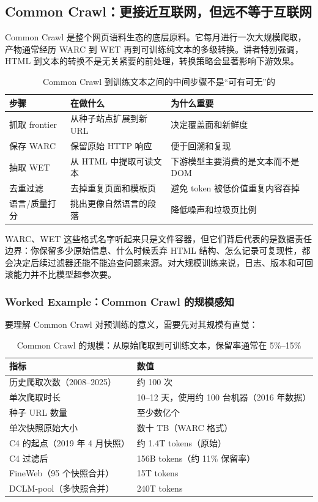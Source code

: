 \subsection{Common Crawl：更接近互联网，但远不等于互联网}

Common Crawl 是整个网页语料生态的底层原料。它每月进行一次大规模爬取，产物通常经历 WARC 到 WET 再到可训练纯文本的多级转换。讲者特别强调，HTML 到文本的转换不是无关紧要的前处理，转换策略会显著影响下游效果。

\begin{table}[H]
\centering
\begin{tabular}{p{}p{}p{}}
\toprule
\textbf{步骤} & \textbf{在做什么} & \textbf{为什么重要} \\
\midrule
抓取 frontier & 从种子站点扩展到新 URL & 决定覆盖面和新鲜度 \\
保存 WARC & 保留原始 HTTP 响应 & 便于回溯和复现 \\
抽取 WET & 从 HTML 中提取可读文本 & 下游模型主要消费的是文本而不是 DOM \\
去重过滤 & 去掉重复页面和模板页 & 避免 token 被低价值重复内容吞掉 \\
语言/质量打分 & 挑出更像自然语言的段落 & 降低噪声和垃圾页比例 \\
\bottomrule
\end{tabular}
\caption{Common Crawl 到训练文本之间的中间步骤不是“可有可无”的}
\end{table}

WARC、WET 这些格式名字听起来只是文件容器，但它们背后代表的是数据责任边界：你保留多少原始信息、什么时候丢弃 HTML 结构、怎么记录可复现性，都会决定后续过滤器还能不能追查问题来源。对大规模训练来说，日志、版本和可回滚能力并不比模型超参次要。

\subsubsection{Worked Example：Common Crawl 的规模感知}

要理解 Common Crawl 对预训练的意义，需要先对其规模有直觉：

\begin{table}[H]
\centering
\begin{tabular}{p{}p{}}
\toprule
\textbf{指标} & \textbf{数值} \\
\midrule
历史爬取次数（2008--2025） & 约 100 次 \\
单次爬取时长 & 10--12 天，使用约 100 台机器（2016 年数据） \\
种子 URL 数量 & 至少数亿个 \\
单次快照原始大小 & 数十 TB（WARC 格式） \\
C4 的起点（2019 年 4 月快照） & 约 1.4T tokens（原始） \\
C4 过滤后 & 156B tokens（约 11\% 保留率） \\
FineWeb（95 个快照合并） & 15T tokens \\
DCLM-pool（多快照合并） & 240T tokens \\
\bottomrule
\end{tabular}
\caption{Common Crawl 的规模：从原始爬取到可训练文本，保留率通常在 5\%--15\%}
\end{table}

